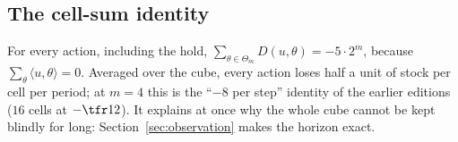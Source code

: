 \subsection{The cell-sum identity}
For every action, including the hold, $\sum_{\theta\in\Theta_m}D(u,\theta)=-5\cdot2^m$, because $\sum_\theta\langle u,\theta\rangle=0$. Averaged over the cube, every action loses half a unit of stock per cell per period; at $m=4$ this is the ``$-8$ per step'' identity of the earlier editions ($16$ cells at $-\tfr12$). It explains at once why the whole cube cannot be kept blindly for long: Section~\ref{sec:observation} makes the horizon exact.
